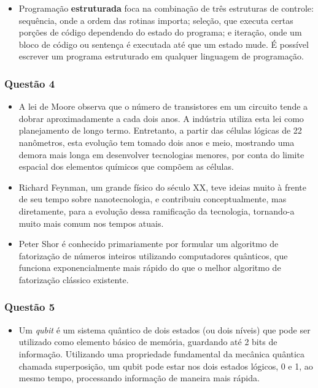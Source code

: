\documentclass{article}
\begin{document}
\begin{itemize}
    \item Programação \textbf{estruturada} foca na combinação de três estruturas de controle: sequência, onde a ordem das rotinas importa; seleção, que executa certas porções de código dependendo do estado do programa; e iteração, onde um bloco de código ou sentença é executada até que um estado mude. É possível escrever um programa estruturado em qualquer linguagem de programação. 
\end{itemize}

\newpage

\subsubsection*{Questão 4}
\begin{itemize}
    \item A lei de Moore observa que o número de transistores em um circuito tende a dobrar aproximadamente a cada dois anos. A indústria utiliza esta lei como planejamento de longo termo. Entretanto, a partir das células lógicas de 22 nanômetros, esta evolução tem tomado dois anos e meio, mostrando uma demora mais longa em desenvolver tecnologias menores, por conta do limite espacial dos elementos químicos que compõem as células.
    
    \item Richard Feynman, um grande físico do século XX, teve ideias muito à frente de seu tempo sobre nanotecnologia, e contribuiu conceptualmente, mas diretamente, para a evolução dessa ramificação da tecnologia, tornando-a muito mais comum nos tempos atuais.
    
    \item Peter Shor é conhecido primariamente por formular um algoritmo de fatorização de números inteiros utilizando computadores quânticos, que funciona exponencialmente mais rápido do que o melhor algoritmo de fatorização clássico existente. 
\end{itemize}

\subsubsection*{Questão 5}
\begin{itemize}
    \item Um \textit{qubit} é um sistema quântico de dois estados (ou dois níveis) que pode ser utilizado como elemento básico de memória, guardando até 2 bits de informação. Utilizando uma propriedade fundamental da mecânica quântica chamada superposição, um qubit pode estar nos dois estados lógicos, 0 e 1, ao mesmo tempo, processando informação de maneira mais rápida.
\end{itemize}
\end{document}
